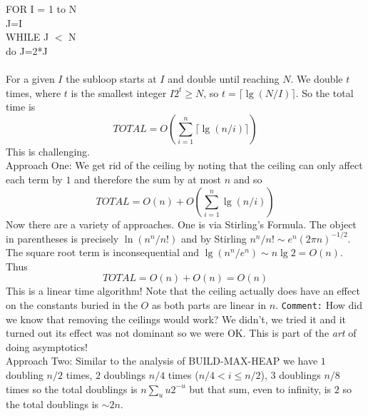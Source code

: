 \documentclass{article}
\begin{document}
\begin{enumerate}
\begin{enumerate}
{{    FOR I = 1 to N
    \\ \hspace*{1cm} J=I
    \\ \hspace*{1cm} WHILE J $<$ N
    \\ \hspace*{2cm} do J=2*J}}
        \\\\ For a given $I$ the subloop starts at $I$ and double until reaching $N$. We double $t$ times, where $t$ is the smallest integer $I2^t\geq N$, so $t=\lceil \lg(N/I) \rceil$. So the total time is 
        \begin{equation}TOTAL = O\left( \sum_{i=1}^n \lceil\lg(n/i)\rceil \right)\end{equation}
		This is challenging.  
		\\ Approach One: We get rid of the ceiling by noting that the ceiling can only affect each term by $1$ and therefore the sum by at most $n$ and so 
		\begin{equation}TOTAL = O(n)+O\left( \sum_{i=1}^n \lg(n/i) \right)\end{equation}
		Now there are a variety of approaches. One is via Stirling's Formula. The object in parentheses is precisely $\ln(n^n/n!)$ and by Stirling $n^n/n! \sim e^n(2\pi n)^{-1/2}$. The square root term is inconsequential and $\lg(n^n/e^n) \sim n\lg 2 = O(n)$. Thus 
		\begin{equation}TOTAL = O(n) + O(n ) = O(n)\end{equation}
		This is a linear time algorithm! Note that the ceiling actually does have an effect on the constants buried in the $O$ as both parts are linear in $n$. {\tt Comment:} How did we know that removing the ceilings would work? We didn't, we tried it and it turned out its 
		effect was not dominant so we were OK. This is part of the {\em art} of doing asymptotics!
		\\ Approach Two: Similar to the analysis of BUILD-MAX-HEAP we have $1$ doubling $n/2$ times, $2$ doublings $n/4$ times ($n/4 < i \leq n/2$), $3$ doublings $n/8$ times so the total doublings is $n \sum_u u2^{-u}$ but that sum, even to infinity, is $2$ so the total doublings is $\sim 2n$.
    \end{enumerate}
    

\end{enumerate}
\end{document}
